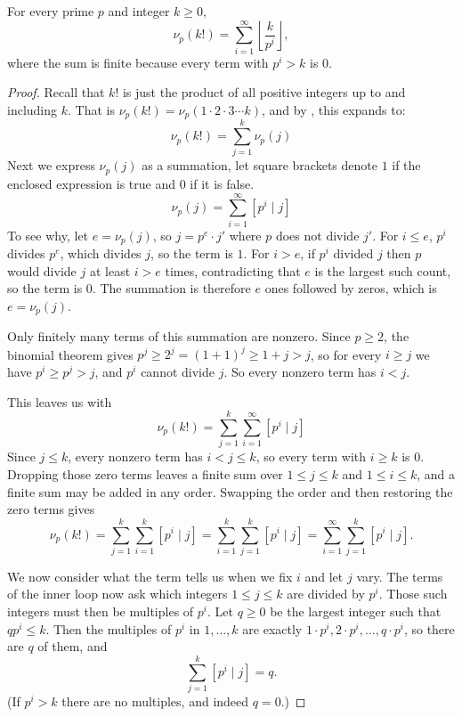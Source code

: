 \documentclass{article}
\begin{document}
\begin{lemma}\label{lem:legendre}
  For every prime $p$ and integer $k \ge 0$,
  \[
    \nu_p(k!) = \sum_{i=1}^{\infty} \left\lfloor \frac{k}{p^i} \right\rfloor,
  \]
  where the sum is finite because every term with $p^i > k$ is $0$.
\end{lemma}
\begin{proof}
  Recall that $k!$ is just the product of all positive integers up to and including $k$.
  That is $\nu_p(k!) = \nu_p(1 \cdot 2 \cdot 3 \cdots k)$,
  and by , this expands to:
  \[
    \nu_p(k!) = \sum_{j=1}^{k} \nu_p(j)
  \]
  Next we express $\nu_p(j)$ as a summation, let square brackets denote $1$ if the enclosed expression is true and $0$
  if it is false. 
  \[
  \nu_p(j) = \sum_{i=1}^{\infty} \left[p^i \mid j\right]
  \]
  To see why, let $e = \nu_p(j)$, so $j = p^e \cdot j'$ where $p$ does not divide $j'$. For $i \le e$, $p^i$ divides
  $p^e$, which divides $j$, so the term is $1$. For $i > e$, if $p^i$ divided $j$ then $p$ would divide $j$ at least
  $i > e$ times, contradicting that $e$ is the largest such count, so the term is $0$. The summation is therefore $e$
  ones followed by zeros, which is $e = \nu_p(j)$.

  Only finitely many terms of this summation are nonzero. Since $p \ge 2$, the binomial theorem gives
  $p^j \ge 2^j = {(1 + 1)}^j \ge 1 + j > j$, so for every $i \ge j$ we have $p^i \ge p^j > j$, and $p^i$ cannot divide
  $j$. So every nonzero term has $i < j$.

  This leaves us with
  \[
    \nu_p(k!) = \sum_{j=1}^{k} \sum_{i=1}^{\infty} \left[p^i \mid j\right]
  \]
  Since $j \le k$, every nonzero term has $i < j \le k$, so every term with $i \ge k$ is $0$. Dropping those zero terms
  leaves a finite sum over $1 \le j \le k$ and $1 \le i \le k$, and a finite sum may be added in any order. Swapping
  the order and then restoring the zero terms gives
  \[
    \nu_p(k!) = \sum_{j=1}^{k} \sum_{i=1}^{k} \left[p^i \mid j\right]
      = \sum_{i=1}^{k} \sum_{j=1}^{k} \left[p^i \mid j\right]
      = \sum_{i=1}^{\infty} \sum_{j=1}^{k} \left[p^i \mid j\right].
  \]

  We now consider what the term tells us when we fix $i$ and let $j$ vary.
  The terms of the inner loop now ask which integers $1\le j\le k$ are divided by $p^i$. 
  Those such integers must then be multiples of $p^i$. Let $q \ge 0$ be the largest integer such that $q p^i \le k$.
  Then the multiples of $p^i$ in $1, \dots, k$ are exactly $1 \cdot p^i, 2 \cdot p^i, \dots, q \cdot p^i$, so there are
  $q$ of them, and
  \[
    \sum_{j=1}^{k} \left[p^i \mid j\right] = q.
  \]
  (If $p^i > k$ there are no multiples, and indeed $q = 0$.)


\end{proof}
\end{document}
